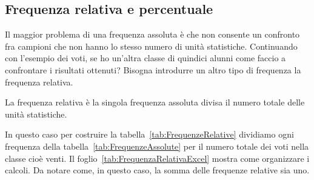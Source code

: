 \subsection{Frequenza relativa e percentuale}
Il maggior problema di una frequenza assoluta è che non consente un confronto fra campioni che non hanno lo stesso numero di unità statistiche. Continuando con l'esempio dei voti, se ho un'altra  classe di quindici alunni come faccio a confrontare i risultati ottenuti? Bisogna introdurre un altro tipo di frequenza la frequenza relativa. 
\begin{definizione}
La frequenza relativa è la singola frequenza assoluta divisa il numero totale delle unità statistiche. 
\end{definizione}
In questo caso per costruire la tabella~\vref{tab:FrequenzeRelative} dividiamo ogni frequenza della tabella~\vref{tab:FrequenzeAssolute} per il numero totale dei voti nella classe cioè venti. Il foglio~\vref{tab:FrequenzaRelativaExcel} mostra come organizzare i calcoli.  Da  notare come, in questo caso,  la somma delle frequenze relative sia uno. 

